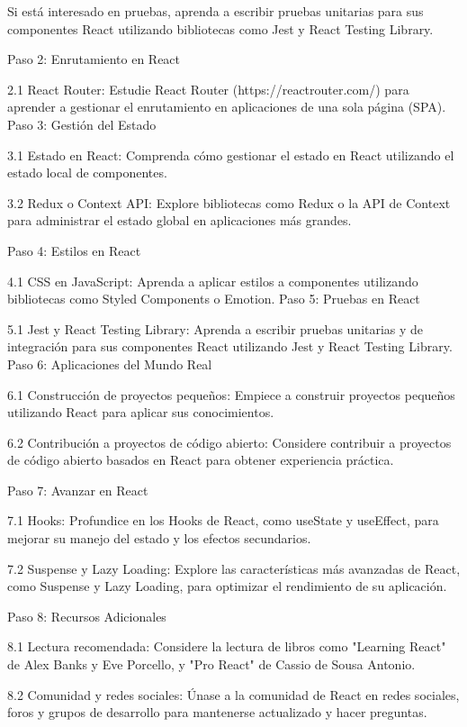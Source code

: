 \documentclass[executivepaper]{article}
\begin{document}
Si está interesado en pruebas, aprenda a escribir pruebas unitarias para sus componentes React utilizando bibliotecas como Jest y React Testing Library.












Paso 2: Enrutamiento en React

2.1 React Router: Estudie React Router (https://reactrouter.com/) para aprender a gestionar el enrutamiento en aplicaciones de una sola página (SPA).
Paso 3: Gestión del Estado

3.1 Estado en React: Comprenda cómo gestionar el estado en React utilizando el estado local de componentes.

3.2 Redux o Context API: Explore bibliotecas como Redux o la API de Context para administrar el estado global en aplicaciones más grandes.

Paso 4: Estilos en React

4.1 CSS en JavaScript: Aprenda a aplicar estilos a componentes utilizando bibliotecas como Styled Components o Emotion.
Paso 5: Pruebas en React

5.1 Jest y React Testing Library: Aprenda a escribir pruebas unitarias y de integración para sus componentes React utilizando Jest y React Testing Library.
Paso 6: Aplicaciones del Mundo Real

6.1 Construcción de proyectos pequeños: Empiece a construir proyectos pequeños utilizando React para aplicar sus conocimientos.

6.2 Contribución a proyectos de código abierto: Considere contribuir a proyectos de código abierto basados en React para obtener experiencia práctica.

Paso 7: Avanzar en React

7.1 Hooks: Profundice en los Hooks de React, como useState y useEffect, para mejorar su manejo del estado y los efectos secundarios.

7.2 Suspense y Lazy Loading: Explore las características más avanzadas de React, como Suspense y Lazy Loading, para optimizar el rendimiento de su aplicación.

Paso 8: Recursos Adicionales

8.1 Lectura recomendada: Considere la lectura de libros como "Learning React" de Alex Banks y Eve Porcello, y "Pro React" de Cassio de Sousa Antonio.

8.2 Comunidad y redes sociales: Únase a la comunidad de React en redes sociales, foros y grupos de desarrollo para mantenerse actualizado y hacer preguntas.
\end{document}
